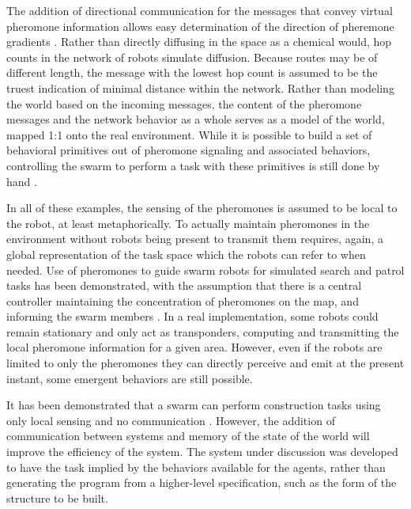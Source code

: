 \documentclass[]{article}
\begin{document}
The addition of directional communication for the messages that convey virtual pheromone information allows easy determination of the direction of pheremone gradients \cite{payton2001pheromone}.
Rather than directly diffusing in the space as a chemical would, hop counts in the network of robots simulate diffusion. 
Because routes may be of different length, the message with the lowest hop count is assumed to be the truest indication of minimal distance within the network. 
Rather than modeling the world based on the incoming messages, the content of the pheromone messages and the network behavior as a whole serves as a model of the world, mapped 1:1 onto the real environment. 
While it is possible to build a set of behavioral primitives out of pheromone signaling and associated behaviors, controlling the swarm to perform a task with these primitives is still done by hand \cite{payton2003compound}.

In all of these examples, the sensing of the pheromones is assumed to be local to the robot, at least metaphorically. 
To actually maintain pheromones in the environment without robots being present to transmit them requires, again, a global representation of the task space which the robots can refer to when needed. 
Use of pheromones to guide swarm robots for simulated search and patrol tasks has been demonstrated, with the assumption that there is a central controller maintaining the concentration of pheromones on the map, and informing the swarm members \cite{coppin2012controlling}. 
In a real implementation, some robots could remain stationary and only act as transponders, computing and transmitting the local pheromone information for a given area. 
However, even if the robots are limited to only the pheromones they can directly perceive and emit at the present instant, some emergent behaviors are still possible. 

It has been demonstrated that a swarm can perform construction tasks using only local sensing and no communication \cite{wawerla2002collective, bowyer2000automated}.
However, the addition of communication between systems and memory of the state of the world will improve the efficiency of the system.
The system under discussion was developed to have the task implied by the behaviors available for the agents, rather than generating the program from a higher-level specification, such as the form of the structure to be built.
\end{document}
